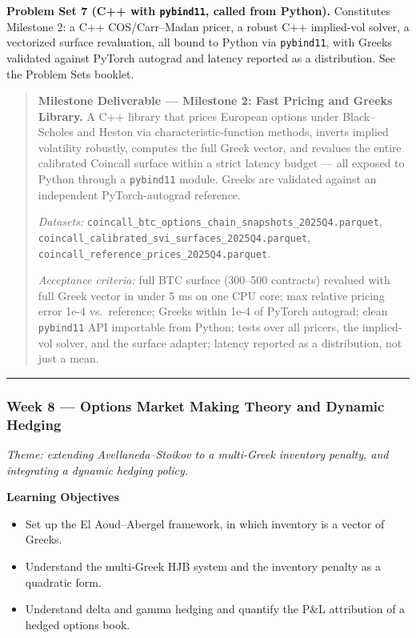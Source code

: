\documentclass[
]{article}
\providecommand{\tightlist}{%
  \setlength{\itemsep}{0pt}\setlength{\parskip}{0pt}}
\begin{document}
\textbf{Problem Set 7 (C++ with \texttt{pybind11}, called from Python).}
Constitutes Milestone 2: a C++ COS/Carr--Madan pricer, a robust C++
implied-vol solver, a vectorized surface revaluation, all bound to
Python via \texttt{pybind11}, with Greeks validated against PyTorch
autograd and latency reported as a distribution. See the Problem Sets
booklet.

\begin{quote}
\textbf{Milestone Deliverable --- Milestone 2: Fast Pricing and Greeks
Library.} A C++ library that prices European options under
Black--Scholes and Heston via characteristic-function methods, inverts
implied volatility robustly, computes the full Greek vector, and
revalues the entire calibrated Coincall surface within a strict latency
budget --- all exposed to Python through a \texttt{pybind11} module.
Greeks are validated against an independent PyTorch-autograd reference.

\emph{Datasets:}
\texttt{coincall\_btc\_options\_chain\_snapshots\_2025Q4.parquet},
\texttt{coincall\_calibrated\_svi\_surfaces\_2025Q4.parquet},
\texttt{coincall\_reference\_prices\_2025Q4.parquet}.

\emph{Acceptance criteria:} full BTC surface (300--500 contracts)
revalued with full Greek vector in under 5 ms on one CPU core; max
relative pricing error 1e-4 vs.~reference; Greeks within 1e-4 of PyTorch
autograd; clean \texttt{pybind11} API importable from Python; tests over
all pricers, the implied-vol solver, and the surface adapter; latency
reported as a distribution, not just a mean.
\end{quote}

\begin{center}\rule{0.5\linewidth}{0.5pt}\end{center}

\subsubsection{Week 8 --- Options Market Making Theory and Dynamic
Hedging}\label{week-8-options-market-making-theory-and-dynamic-hedging}

\emph{Theme: extending Avellaneda--Stoikov to a multi-Greek inventory
penalty, and integrating a dynamic hedging policy.}

\textbf{Learning Objectives}

\begin{itemize}
\tightlist
\item
  Set up the El Aoud--Abergel framework, in which inventory is a vector
  of Greeks.
\item
  Understand the multi-Greek HJB system and the inventory penalty as a
  quadratic form.
\item
  Understand delta and gamma hedging and quantify the P\&L attribution
  of a hedged options book.
\end{itemize}
\end{document}
